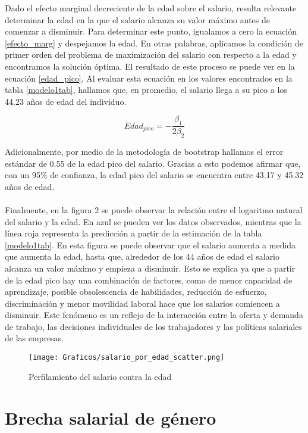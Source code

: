 \documentclass[article,11 pt]{article}
\begin{document}
Dado el efecto marginal decreciente de la edad sobre el salario, resulta relevante determinar la edad en la que el salario alcanza su valor máximo antes de comenzar a disminuir. Para determinar este punto, igualamos a cero la ecuación \ref{efecto_marg} y despejamos la edad. En otras palabras, aplicamos la condición de primer orden del problema de maximización del salario con respecto a la edad y encontramos la solución óptima. El resultado de este proceso se puede ver en la ecuación \ref{edad_pico}. Al evaluar esta ecuación en los valores encontrados en la tabla \ref{modelo1tab}, hallamos que, en promedio, el salario llega a su pico a los 44.23 años de edad del individuo.

\begin{equation}
    Edad_{pico} = -\frac{\beta_1}{2\beta_2}
    \label{edad_pico}
\end{equation}

Adicionalmente, por medio de la metodología de bootstrap hallamos el error estándar de 0.55 de la edad pico del salario. Gracias a esto podemos afirmar que, con un 95\% de confianza, la edad pico del salario se encuentra entre 43.17 y 45.32 años de edad. 
\\
\\
Finalmente, en la figura 2 se puede observar la relación entre el logaritmo natural del salario y la edad. En azul se pueden ver los datos observados, mientras que la línea roja representa la predicción a partir de la estimación de la tabla \ref{modelo1tab}. En esta figura se puede observar que el salario aumenta a medida que aumenta la edad, hasta que, alrededor de los 44 años de edad el salario alcanza un valor máximo y empieza a disminuir.  Esto se explica ya que a partir de la edad pico hay una combinación de factores, como de menor capacidad de aprendizaje, posible obsolescencia de habilidades, reducción de esfuerzo, discriminación y menor movilidad laboral hace que los salarios comiencen a disminuir. Este fenómeno es un reflejo de la interacción entre la oferta y demanda de trabajo, las decisiones individuales de los trabajadores y las políticas salariales de las empresas.


\begin{figure}[h]
    \centering
    \caption{Perfilamiento del salario contra la edad}
    \texttt{[image: Graficos/salario\_por\_edad\_scatter.png]}
    \label{fig:salario_edad}
\end{figure}


\newpage
\section{Brecha salarial de género}
\end{document}
